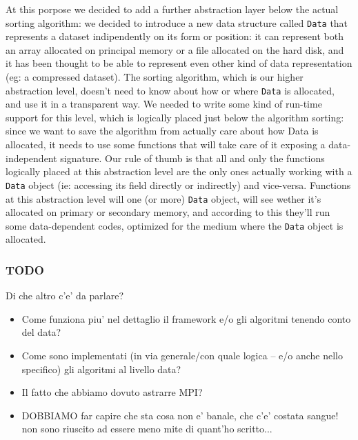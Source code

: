 At this porpose we decided to add a further abstraction layer below the actual sorting algorithm: we decided to introduce a new data structure called \texttt{Data} that represents a dataset indipendently on its form or position: it can represent both an array allocated on principal memory or a file allocated on the hard disk, and it has been thought to be able to represent even other kind of data representation (eg: a compressed dataset). The sorting algorithm, which is our higher abstraction level, doesn't need to know about how or where \texttt{Data} is allocated, and use it in a transparent way.
We needed to write some kind of run-time support for this level, which is logically placed just below the algorithm sorting: since we want to save the algorithm from actually care about how Data is allocated, it needs to use some functions that will take care of it exposing a data-independent signature. Our rule of thumb is that all and only the functions logically placed at this abstraction level are the only ones actually working with a \texttt{Data} object (ie: accessing its field directly or indirectly) and vice-versa.
Functions at this abstraction level will one (or more) \texttt{Data} object, will see wether it's allocated on primary or secondary memory, and according to this they'll run some data-dependent codes, optimized for the medium where the \texttt{Data} object is allocated.

\subsubsection*{TODO}
Di che altro c'e' da parlare?
\begin{itemize}
	\item{Come funziona piu' nel dettaglio il framework e/o gli algoritmi tenendo conto del data?}
	\item{Come sono implementati (in via generale/con quale logica -- e/o anche nello specifico) gli algoritmi al livello data?}
	\item{Il fatto che abbiamo dovuto astrarre MPI?}
	\item{DOBBIAMO far capire che sta cosa non e' banale, che c'e' costata sangue! non sono riuscito ad essere meno mite di quant'ho scritto...}
\end{itemize}



